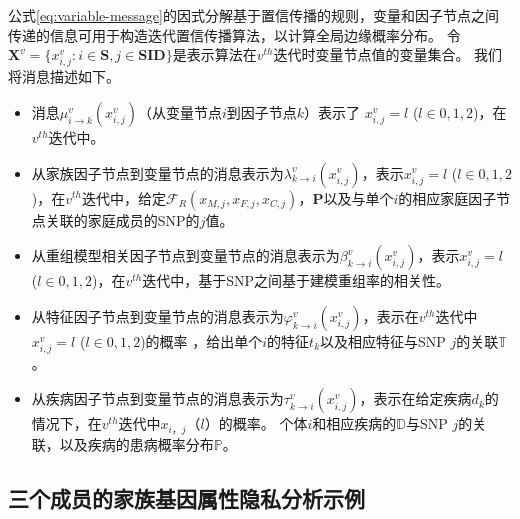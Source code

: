 公式\ref{eq:variable-message}的因式分解基于置信传播的规则，变量和因子节点之间传递的信息可用于构造迭代置信传播算法，以计算全局边缘概率分布。 令$\mathbf{X}^v=\{x_{i,j}^v: i\in \mathbf{S}, j \in \mathbf{SID}\}$是表示算法在$v^{th}$迭代时变量节点值的变量集合。 我们将消息描述如下。

\begin{itemize}
	\item 消息$\mu_{i\rightarrow k}^{v}(x_{i,j}^{v})$（从变量节点$i$到因子节点$k$）表示了 $x_{i,j}^v=l$ ($l \in {0,1,2}$)，在$v^{th}$迭代中。
	\item 从家族因子节点到变量节点的消息表示为$\lambda_{k \rightarrow i}^v(x_{i,j}^v)$，表示$x_{i,j}^v=l$ ($l \in {0,1,2}$)，在$v^{th}$迭代中，给定$\mathcal{F}_{R}(x_{M,j},x_{F,j}, x_{C,j})$，$\mathbf{P}$以及与单个$i$的相应家庭因子节点关联的家庭成员的SNP的$j$值。
	\item 从重组模型相关因子节点到变量节点的消息表示为$\beta_{k \rightarrow i}^v(x_{i,j}^v)$，表示$x_{i,j}^v=l$ ($l \in {0,1,2}$)，在$v^{th}$迭代中，基于SNP之间基于建模重组率的相关性。
	\item 从特征因子节点到变量节点的消息表示为$\varphi_{k \rightarrow i}^v(x_{i,j}^v)$，表示在$v^{th}$迭代中 $x_{i,j}^v=l$ ($l \in {0,1,2}$)的概率 ，给出单个$i$的特征$t_k$以及相应特征与SNP $j$的关联$\mathbb{T}$。
	\item 从疾病因子节点到变量节点的消息表示为$\tau_{k \rightarrow i}^v(x_{i,j}^v)$，表示在给定疾病$d_k$的情况下，在$v^{th}$迭代中$ x_ {i，j} $（$ l $）的概率。 个体$i$和相应疾病的$\mathbb{D}$与SNP $j$的关联，以及疾病的患病概率分布$\mathbb{P}$。
	
\end{itemize}

\subsection{三个成员的家族基因属性隐私分析示例}

